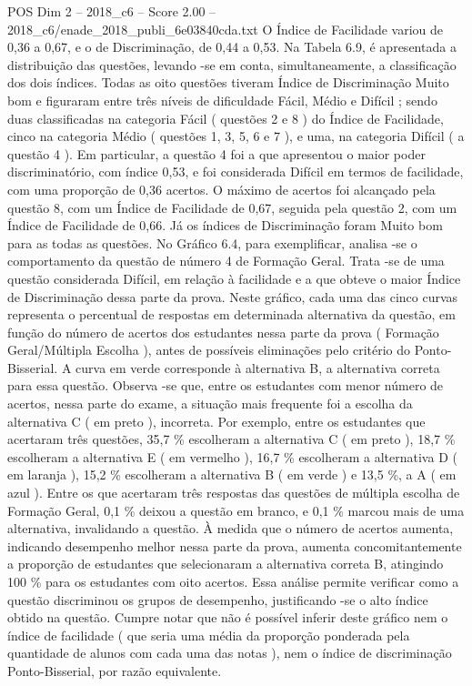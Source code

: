 \begin{textsample}{POS Dim 2 – 2018\_c6 – Score 2.00 – 2018\_c6/enade\_2018\_publi\_6e03840cda.txt}
O Índice de Facilidade variou de 0,36 a 0,67, e o de Discriminação, de 0,44 a 0,53.
Na Tabela 6.9, é apresentada a distribuição das questões, levando -se em conta, simultaneamente, a classificação dos dois índices.
Todas as oito questões tiveram Índice de Discriminação Muito bom e figuraram entre três níveis de dificuldade Fácil, Médio e Difícil ; sendo duas classificadas na categoria Fácil ( questões 2 e 8 ) do Índice de Facilidade, cinco na categoria Médio ( questões 1, 3, 5, 6 e 7 ), e uma, na categoria Difícil ( a questão 4 ).
Em particular, a questão 4 foi a que apresentou o maior poder discriminatório, com índice 0,53, e foi considerada Difícil em termos de facilidade, com uma proporção de 0,36 acertos.
O máximo de acertos foi alcançado pela questão 8, com um Índice de Facilidade de 0,67, seguida pela questão 2, com um Índice de Facilidade de 0,66.
Já os índices de Discriminação foram Muito bom para as todas as questões.
No Gráfico 6.4, para exemplificar, analisa -se o comportamento da questão de número 4 de Formação Geral.
Trata -se de uma questão considerada Difícil, em relação à facilidade e a que obteve o maior Índice de Discriminação dessa parte da prova.
Neste gráfico, cada uma das cinco curvas representa o percentual de respostas em determinada alternativa da questão, em função do número de acertos dos estudantes nessa parte da prova ( Formação Geral/Múltipla Escolha ), antes de possíveis eliminações pelo critério do Ponto-Bisserial.
A curva em verde corresponde à alternativa B, a alternativa correta para essa questão.
Observa -se que, entre os estudantes com menor número de acertos, nessa parte do exame, a situação mais frequente foi a escolha da alternativa C ( em preto ), incorreta.
Por exemplo, entre os estudantes que acertaram três questões, 35,7 \% escolheram a alternativa C ( em preto ), 18,7 \% escolheram a alternativa E ( em vermelho ), 16,7 \% escolheram a alternativa D ( em laranja ), 15,2 \% escolheram a alternativa B ( em verde ) e 13,5 \%, a A ( em azul ).
Entre os que acertaram três respostas das questões de múltipla escolha de Formação Geral, 0,1 \% deixou a questão em branco, e 0,1 \% marcou mais de uma alternativa, invalidando a questão.
À medida que o número de acertos aumenta, indicando desempenho melhor nessa parte da prova, aumenta concomitantemente a proporção de estudantes que selecionaram a alternativa correta B, atingindo 100 \% para os estudantes com oito acertos.
Essa análise permite verificar como a questão discriminou os grupos de desempenho, justificando -se o alto índice obtido na questão.
Cumpre notar que não é possível inferir deste gráfico nem o índice de facilidade ( que seria uma média da proporção ponderada pela quantidade de alunos com cada uma das notas ), nem o índice de discriminação Ponto-Bisserial, por razão equivalente.

\end{textsample}
